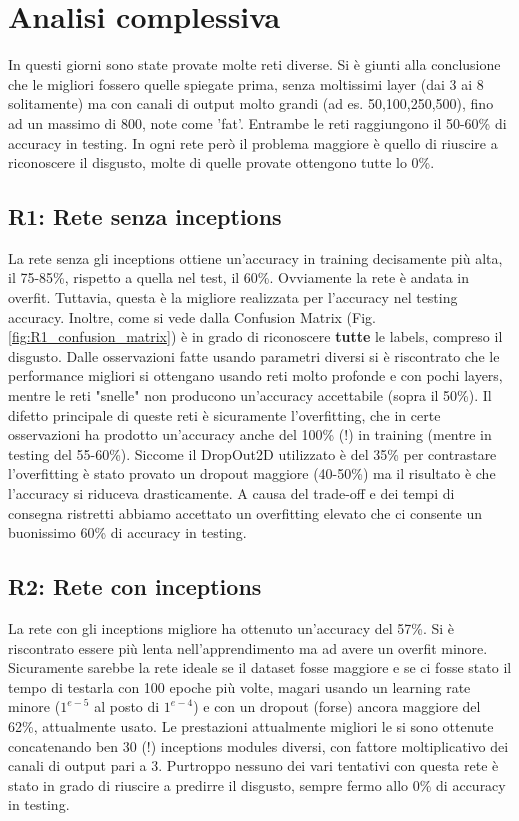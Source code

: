 \documentclass[target=mst]{thud}
\begin{document}
\chapter{Analisi complessiva}
In questi giorni sono state provate molte reti diverse. Si è giunti alla conclusione che le migliori fossero quelle spiegate prima, senza moltissimi layer (dai 3 ai 8 solitamente) ma con canali di output molto grandi (ad es. 50,100,250,500), fino ad un massimo di 800, note come 'fat'. Entrambe le reti raggiungono il 50-60\% di accuracy in testing.
In ogni rete però il problema maggiore è quello di riuscire a riconoscere il disgusto, molte di quelle provate ottengono tutte lo 0\%.

\section{R1: Rete senza inceptions}
La rete senza gli inceptions ottiene un'accuracy in training decisamente più alta, il 75-85\%, rispetto a quella nel test, il 60\%. Ovviamente la rete è andata in overfit. 
Tuttavia, questa è la migliore realizzata per l'accuracy nel testing accuracy. Inoltre, come si vede dalla Confusion Matrix (Fig. \ref{fig:R1_confusion_matrix}) è in grado di riconoscere \textbf{tutte} le labels, compreso il disgusto.
Dalle osservazioni fatte usando parametri diversi si è riscontrato che le performance migliori si ottengano usando reti molto profonde e con pochi layers, mentre le reti "snelle" non producono un'accuracy accettabile (sopra il 50\%).
Il difetto principale di queste reti è sicuramente l'overfitting, che in certe osservazioni ha prodotto un'accuracy anche del 100\% (!) in training (mentre in testing del 55-60\%).
Siccome il DropOut2D utilizzato è del 35\% per contrastare l'overfitting è stato provato un dropout maggiore (40-50\%) ma il risultato è che l'accuracy si riduceva drasticamente.
A causa del trade-off e dei tempi di consegna ristretti abbiamo accettato un overfitting elevato che ci consente un buonissimo 60\% di accuracy in testing.

\section{R2: Rete con inceptions}
La rete con gli inceptions migliore ha ottenuto un'accuracy del 57\%.
Si è riscontrato essere più lenta nell'apprendimento ma ad avere un overfit minore.
Sicuramente sarebbe la rete ideale se il dataset fosse maggiore e se ci fosse stato il tempo di testarla con 100 epoche più volte, magari usando un learning rate minore ($1^{e-5}$ al posto di $1^{e-4}$) e con un dropout (forse) ancora maggiore del 62\%, attualmente usato.
Le prestazioni attualmente migliori le si sono ottenute concatenando ben 30 (!) inceptions modules diversi, con fattore moltiplicativo dei canali di output pari a 3.
Purtroppo nessuno dei vari tentativi con questa rete è stato in grado di riuscire a predirre il disgusto, sempre fermo allo 0\% di accuracy in testing.
\end{document}
